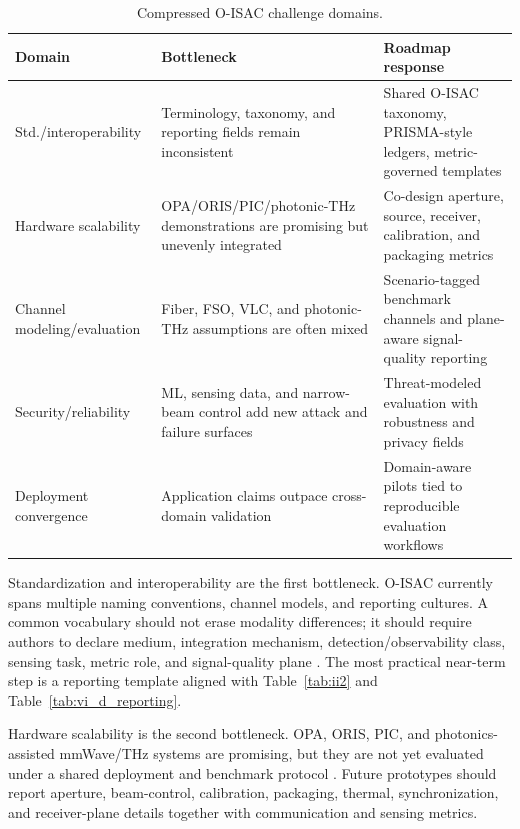 \documentclass[letterpaper,journal]{IEEEtran}
\begin{document}
\begin{table}[!t]
    \caption{Compressed O-ISAC challenge domains.}
    \label{tab:challenge_compact}
    \centering
    \scriptsize
    \setlength{\tabcolsep}{2.8pt}
    \renewcommand{\arraystretch}{1.08}
    \begin{tabularx}{\textwidth}{@{}L{2.4cm}L{3.0cm}X@{}}
        \toprule
        Domain & Bottleneck & Roadmap response \\
        \midrule
        Std./interoperability & Terminology, taxonomy, and reporting fields remain inconsistent & Shared O-ISAC taxonomy, PRISMA-style ledgers, metric-governed templates \\
        Hardware scalability & OPA/ORIS/PIC/photonic-THz demonstrations are promising but unevenly integrated & Co-design aperture, source, receiver, calibration, and packaging metrics \\
        Channel modeling/evaluation & Fiber, FSO, VLC, and photonic-THz assumptions are often mixed & Scenario-tagged benchmark channels and plane-aware signal-quality reporting \\
        Security/reliability & ML, sensing data, and narrow-beam control add new attack and failure surfaces & Threat-modeled evaluation with robustness and privacy fields \\
        Deployment convergence & Application claims outpace cross-domain validation & Domain-aware pilots tied to reproducible evaluation workflows \\
        \bottomrule
    \end{tabularx}
\end{table}

Standardization and interoperability are the first bottleneck. O-ISAC currently spans multiple naming conventions, channel models, and reporting cultures. A common vocabulary should not erase modality differences; it should require authors to declare medium, integration mechanism, detection/observability class, sensing task, metric role, and signal-quality plane \cite{O_ISAC_161,O_ISAC_162,O_ISAC_327}. The most practical near-term step is a reporting template aligned with Table~\ref{tab:ii2} and Table~\ref{tab:vi_d_reporting}.

Hardware scalability is the second bottleneck. OPA, ORIS, PIC, and photonics-assisted mmWave/THz systems are promising, but they are not yet evaluated under a shared deployment and benchmark protocol \cite{O_ISAC_008,O_ISAC_036,O_ISAC_061,O_ISAC_091,O_ISAC_145,O_ISAC_163}. Future prototypes should report aperture, beam-control, calibration, packaging, thermal, synchronization, and receiver-plane details together with communication and sensing metrics.
\end{document}
